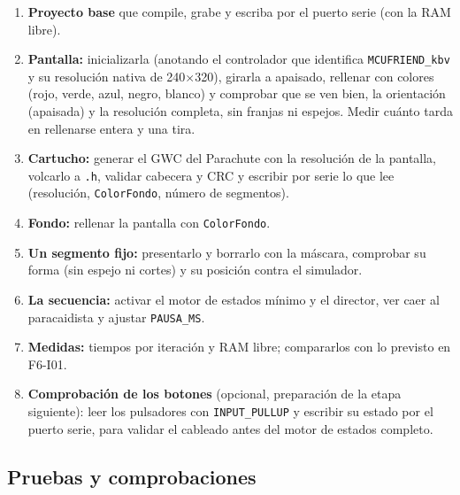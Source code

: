 \begin{enumerate}
	\item \textbf{Proyecto base} que compile, grabe y escriba por el puerto serie (con la RAM libre).
	\item \textbf{Pantalla:} inicializarla (anotando el controlador que identifica \texttt{MCUFRIEND\_kbv} y su resolución nativa de 240$\times$320), girarla a apaisado, rellenar con colores (rojo, verde, azul, negro, blanco) y comprobar que se ven bien, la orientación (apaisada) y la resolución completa, sin franjas ni espejos. Medir cuánto tarda en rellenarse entera y una tira.
	\item \textbf{Cartucho:} generar el GWC del Parachute con la resolución de la pantalla, volcarlo a \texttt{.h}, validar cabecera y CRC y escribir por serie lo que lee (resolución, \texttt{ColorFondo}, número de segmentos).
	\item \textbf{Fondo:} rellenar la pantalla con \texttt{ColorFondo}.
	\item \textbf{Un segmento fijo:} presentarlo y borrarlo con la máscara, comprobar su forma (sin espejo ni cortes) y su posición contra el simulador.
	\item \textbf{La secuencia:} activar el motor de estados mínimo y el director, ver caer al paracaidista y ajustar \texttt{PAUSA\_MS}.
	\item \textbf{Medidas:} tiempos por iteración y RAM libre; compararlos con lo previsto en F6-I01.
	\item \textbf{Comprobación de los botones} (opcional, preparación de la etapa siguiente): leer los pulsadores con \texttt{INPUT\_PULLUP} y escribir su estado por el puerto serie, para validar el cableado antes del motor de estados completo.
\end{enumerate}

\subsection{Pruebas y comprobaciones}
\label{sec:F6I02Pruebas}

